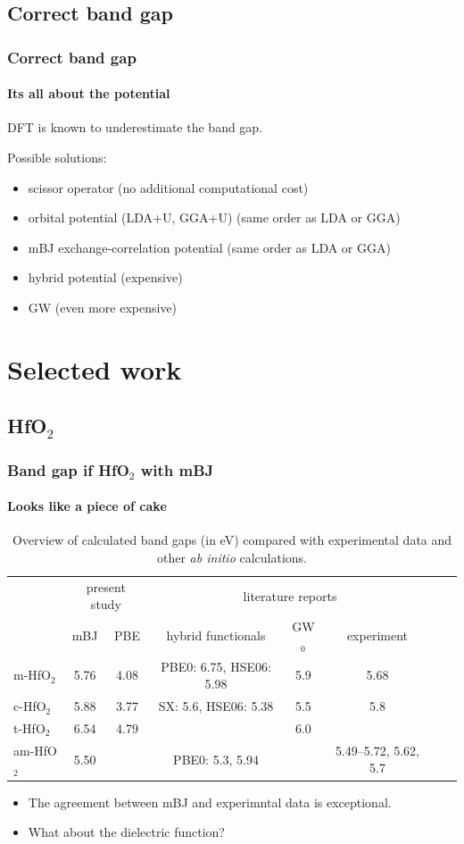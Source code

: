 \documentclass{beamer}
\begin{document}
\subsection{Correct band gap}

\begin{frame}
    \frametitle{Correct band gap}
    \framesubtitle{Its all about the potential}

	DFT is known to underestimate the band gap.

	Possible solutions:
	\begin{itemize}
	\item scissor operator (no additional computational cost)
	\item orbital potential (LDA+U, GGA+U) (same order as LDA or GGA)
	\item mBJ exchange-correlation potential (same order as LDA or GGA)
	\item hybrid potential (expensive)
	\item GW (even more expensive)
	\end{itemize}
\end{frame}

\section{Selected work}
\subsection{HfO$_2$}

\begin{frame}
    \frametitle{Band gap if HfO$_2$ with mBJ}
    \framesubtitle{Looks like a piece of cake}

\begin{table}
\scriptsize \caption{\label{gaps}Overview of calculated band gaps (in eV) compared with experimental data and other \textit{ab initio} calculations.}
\tiny
\setlength{\tabcolsep}{0.5em}
\begin{tabular}{l|cc|ccccc}
 & \multicolumn{2}{c|}{present study} & \multicolumn{3}{c}{literature reports}\\
 & \multicolumn{1}{c|}{mBJ} & PBE & hybrid functionals & GW$_0$ & experiment\\
\hline
m-HfO$_2$ &     5.76 & 4.08 & PBE0: 6.75, HSE06: 5.98 & 5.9 & 5.68 \\
c-HfO$_2$ &     5.88 & 3.77 & SX: 5.6, HSE06: 5.38 & 5.5 & 5.8\\
t-HfO$_2$ &     6.54 & 4.79 & & 6.0 & \\
am-HfO$_2$ & 5.50 & & PBE0: 5.3, 5.94 &  & 5.49--5.72, 5.62, 5.7\\

\end{tabular}
\end{table}

\begin{itemize}
\item The agreement between mBJ and experimntal data is exceptional.
\item What about the dielectric function?
\end{itemize}

\end{frame}
\end{document}
